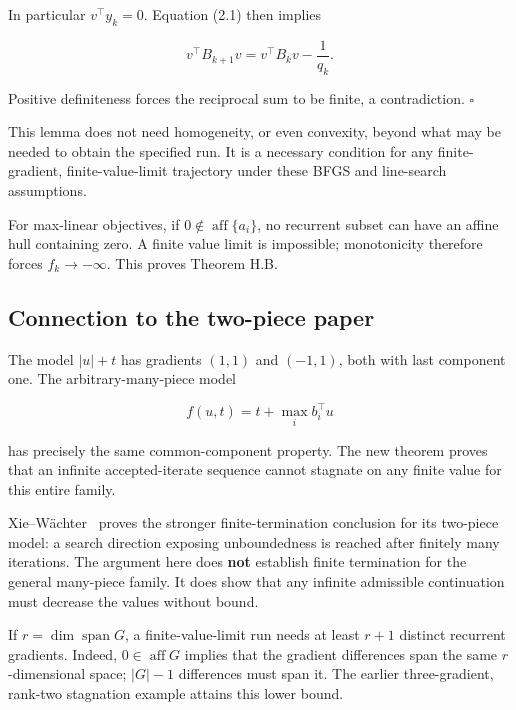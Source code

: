 In particular \(v^\top y_k=0\). Equation (2.1) then implies

\[
v^\top B_{k+1}v=v^\top B_kv-\frac1{q_k}.
\]

Positive definiteness forces the reciprocal sum to be finite, a
contradiction. \(\square\)

This lemma does not need homogeneity, or even convexity, beyond what may
be needed to obtain the specified run. It is a necessary condition for
any finite-gradient, finite-value-limit trajectory under these BFGS and
line-search assumptions.

For max-linear objectives, if \(0\notin\operatorname{aff}\{a_i\}\), no
recurrent subset can have an affine hull containing zero. A finite value
limit is impossible; monotonicity therefore forces \(f_k\to-\infty\).
This proves Theorem H.B.

\subsection{Connection to the two-piece
paper}\label{H:connection-to-the-two-piece-paper}

The model \(|u|+t\) has gradients \((1,1)\) and \((-1,1)\), both with
last component one. The arbitrary-many-piece model

\[
f(u,t)=t+\max_i b_i^\top u
\]

has precisely the same common-component property. The new theorem proves
that an infinite accepted-iterate sequence cannot stagnate on any finite
value for this entire family.

Xie--W\"achter~\cite{XW} proves the stronger finite-termination conclusion
for its two-piece model: a search direction exposing unboundedness is
reached after finitely many iterations. The argument here does
\textbf{not} establish finite termination for the general many-piece
family. It does show that any infinite admissible continuation must
decrease the values without bound.

If \(r=\dim\operatorname{span}G\), a finite-value-limit run needs at
least \(r+1\) distinct recurrent gradients. Indeed,
\(0\in\operatorname{aff}G\) implies that the gradient differences span
the same \(r\)-dimensional space; \(|G|-1\) differences must span it.
The earlier three-gradient, rank-two stagnation example attains this
lower bound.


\setcounter{section}{6}
\setcounter{theorem}{0}
\setcounter{lemma}{0}
\setcounter{corollary}{0}
\setcounter{proposition}{0}
\setcounter{remark}{0}
\setcounter{equation}{0}
